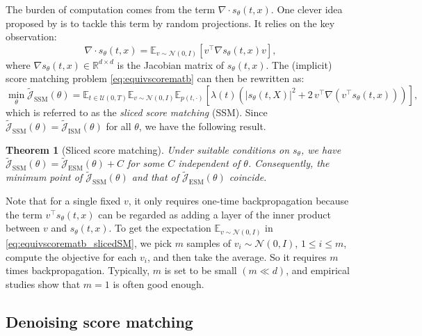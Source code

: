 \documentclass[letterpaper,11pt,reqno]{amsart}
\newtheorem{theorem}{Theorem}[section]
\numberwithin{equation}{section}
\begin{document}
The burden of computation comes from the term $\nabla \cdot s_{\theta}(t,x)$.
One clever idea proposed by \cite{Song20sl} is to tackle this term by random projections.
It relies on the key observation:
\begin{equation}
\label{eq:randompro}
\nabla \cdot s_{\theta}(t,x)=\mathbb{E}_{v\sim \mathcal{N}(0,I)}\left[v^\top \nabla s_{\theta}(t,x)v\right],
\end{equation}
where $\nabla s_{\theta}(t,x) \in \mathbb{R}^{d \times d}$ is the Jacobian matrix of $s_{\theta}(t,x)$.
The (implicit) score matching problem \eqref{eq:equivscorematb}
can then be rewritten as:
\begin{equation}
\label{eq:equivscorematb_slicedSM}
\min_\theta \tilde{\mathcal{J}}_{\text{SSM}}(\theta) = \mathbb{E}_{t \in \mathcal{U}(0, T)}\mathbb{E}_{v \sim \mathcal{N}(0,I)}\mathbb{E}_{p(t, \cdot)} \left[\lambda(t)\left(|s_\theta(t,X)|^2  + 2 \, v^\top \nabla (v^\top s_{\theta}(t,x))\right)\right],
\end{equation}
which is referred to as
the {\em sliced score matching} (SSM).
Since $\tilde{\mathcal{J}}_{\text{SSM}}(\theta) = \tilde{\mathcal{J}}_{\text{ISM}}(\theta)$ for all $\theta$,
we have the following result.
\begin{theorem}[Sliced score matching]
\cite{Song20sl}
Under suitable conditions on $s_{\theta}$,
we have $\tilde{\mathcal{J}}_{\text{SSM}}(\theta) = \tilde{\mathcal{J}}_{\text{ESM}}(\theta) + C$
for some $C$ independent of $\theta$.
Consequently, the minimum point of $\tilde{\mathcal{J}}_{\text{SSM}}(\theta)$ and
that of $\tilde{\mathcal{J}}_{\text{ESM}}(\theta)$ coincide. 
\end{theorem}

\quad Note that for a single fixed $v$, it only requires one-time backpropagation 
because the term $v^\top s_{\theta}(t,x)$ can be regarded as 
adding a layer of the inner product between $v$ and $s_{\theta}(t,x)$.
To get the expectation $\mathbb{E}_{v \sim \mathcal{N}(0, I)}$ in \eqref{eq:equivscorematb_slicedSM}, 
we pick $m$ samples of $v_i \sim \mathcal{N}(0,I)$, $1 \le i \le m$, 
compute the objective for each $v_i$,
and then take the average. 
So it requires $m$ times backpropagation.
Typically, $m$ is set to be small $(m \ll d)$,
and empirical studies show that $m = 1$ is often good enough.

\subsection{Denoising score matching}
\label{sc33}
\end{document}
